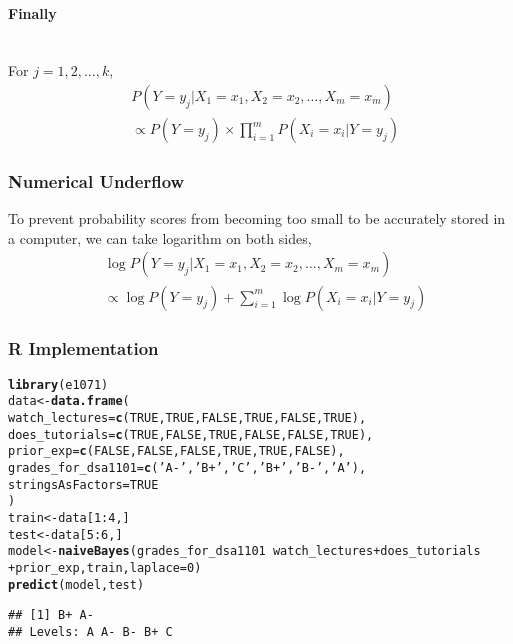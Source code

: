 \documentclass[../../dsa1101_notes.Rtex]{subfiles}\usepackage[]{graphicx}\usepackage[]{color}
\makeatletter
\newcommand{\hlnum}[1]{\textcolor[rgb]{0.686,0.059,0.569}{#1}}%
\newcommand{\hlstr}[1]{\textcolor[rgb]{0.192,0.494,0.8}{#1}}%
\newcommand{\hlopt}[1]{\textcolor[rgb]{0,0,0}{#1}}%
\newcommand{\hlstd}[1]{\textcolor[rgb]{0.345,0.345,0.345}{#1}}%
\newcommand{\hlkwb}[1]{\textcolor[rgb]{0.69,0.353,0.396}{#1}}%
\newcommand{\hlkwc}[1]{\textcolor[rgb]{0.333,0.667,0.333}{#1}}%
\newcommand{\hlkwd}[1]{\textcolor[rgb]{0.737,0.353,0.396}{\textbf{#1}}}%
\newenvironment{kframe}{%
 \def\at@end@of@kframe{}%
 \ifinner\ifhmode%
  \def\at@end@of@kframe{\end{minipage}}%
  \begin{minipage}{\columnwidth}%
 \fi\fi%
 \def\FrameCommand##1{\hskip\@totalleftmargin \hskip-\fboxsep
 \colorbox{shadecolor}{##1}\hskip-\fboxsep
     \hskip-\linewidth \hskip-\@totalleftmargin \hskip\columnwidth}%
 \MakeFramed {\advance\hsize-\width
   \@totalleftmargin\z@ \linewidth\hsize
   \@setminipage}}%
 {\par\unskip\endMakeFramed%
 \at@end@of@kframe}
\newenvironment{knitrout}{}{} %
\makeatother
\begin{document}
\paragraph{Finally}\mbox{}\\
For \(j=1,2,\ldots,k\),
\begin{align*}
&P(Y=y_j\vert X_1=x_1, X_2=x_2, \ldots, X_m=x_m)\\
&\propto P(Y=y_j)\times\prod_{i=1}^{m}P(X_i=x_i\vert Y=y_j)
\end{align*}

\subsubsection{Numerical Underflow}
To prevent probability scores from becoming too small to be accurately stored in a computer, we can take logarithm on both sides,
\begin{align*}
&\log P(Y=y_j\vert X_1=x_1, X_2=x_2, \ldots, X_m=x_m)\\
&\propto\log P(Y=y_j) + \sum_{i=1}^{m}\log P(X_i=x_i\vert Y=y_j)
\end{align*}

\subsubsection{R Implementation}
\begin{knitrout}
\color{fgcolor}\begin{kframe}
\begin{alltt}
\hlkwd{library}\hlstd{(e1071)}
\hlstd{data} \hlkwb{<-} \hlkwd{data.frame}\hlstd{(}
  \hlkwc{watch_lectures} \hlstd{=} \hlkwd{c}\hlstd{(}\hlnum{TRUE}\hlstd{,} \hlnum{TRUE}\hlstd{,} \hlnum{FALSE}\hlstd{,} \hlnum{TRUE}\hlstd{,} \hlnum{FALSE}\hlstd{,} \hlnum{TRUE}\hlstd{),}
  \hlkwc{does_tutorials} \hlstd{=} \hlkwd{c}\hlstd{(}\hlnum{TRUE}\hlstd{,} \hlnum{FALSE}\hlstd{,} \hlnum{TRUE}\hlstd{,} \hlnum{FALSE}\hlstd{,} \hlnum{FALSE}\hlstd{,} \hlnum{TRUE}\hlstd{),}
  \hlkwc{prior_exp} \hlstd{=} \hlkwd{c}\hlstd{(}\hlnum{FALSE}\hlstd{,} \hlnum{FALSE}\hlstd{,} \hlnum{FALSE}\hlstd{,} \hlnum{TRUE}\hlstd{,} \hlnum{TRUE}\hlstd{,} \hlnum{FALSE}\hlstd{),}
  \hlkwc{grades_for_dsa1101} \hlstd{=} \hlkwd{c}\hlstd{(}\hlstr{'A-'}\hlstd{,} \hlstr{'B+'}\hlstd{,} \hlstr{'C'}\hlstd{,} \hlstr{'B+'}\hlstd{,} \hlstr{'B-'}\hlstd{,} \hlstr{'A'}\hlstd{),}
  \hlkwc{stringsAsFactors} \hlstd{=} \hlnum{TRUE}
\hlstd{)}
\hlstd{train} \hlkwb{<-} \hlstd{data[}\hlnum{1}\hlopt{:}\hlnum{4}\hlstd{,]}
\hlstd{test} \hlkwb{<-} \hlstd{data[}\hlnum{5}\hlopt{:}\hlnum{6}\hlstd{,]}
\hlstd{model} \hlkwb{<-} \hlkwd{naiveBayes}\hlstd{(grades_for_dsa1101} \hlopt{~} \hlstd{watch_lectures} \hlopt{+} \hlstd{does_tutorials}
                    \hlopt{+} \hlstd{prior_exp, train,} \hlkwc{laplace} \hlstd{=} \hlnum{0}\hlstd{)}
\hlkwd{predict}\hlstd{(model, test)}
\end{alltt}
\begin{verbatim}
## [1] B+ A-
## Levels: A A- B- B+ C
\end{verbatim}
\end{kframe}
\end{knitrout}
\end{document}
